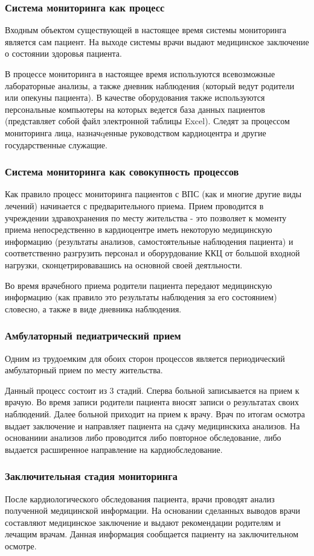 \subsubsection{Система мониторинга как процесс}

Входным объектом существующей в настоящее время системы мониторинга является сам
пациент. На выходе системы врачи выдают медицинское заключение о состоянии
здоровья пациента.

В процессе мониторинга в настоящее время используются всевозможные лабораторные
анализы, а также дневник наблюдения (который ведут родители или опекуны
пациента). В качестве оборудования также используются персональные компьютеры на
которых ведется база данных пациентов (представляет собой файл электронной
таблицы Excel). Следят за процессом мониторинга лица, назначqенные руководством
кардиоцентра и другие государственные служащие.

\subsubsection{Система мониторинга как совокупность процессов}

Как правило процесс мониторинга пациентов с ВПС (как и многие другие виды
лечений) начинается с предварительного приема. Прием проводится в учреждении
здравохранения по месту жительства - это позволяет к моменту приема
непосредственно в кардиоцентре  иметь некоторую медицинскую информацию
(результаты анализов, самостоятельные наблюдения пациента) и соответственно
разгрузить персонал и оборурдование ККЦ от большой входной нагрузки,
сконцетрировавашись на основной своей деятльности.

Во время врачебного приема родители пациента передают медицинскую информацию
(как правило это результаты наблюдения за его состоянием) словесно, а также  в
виде дневника наблюдения.

\subsubsection{Амбулаторный педиатрический прием}

Одним из трудоемким для обоих сторон процессов является периодический
амбулаторный прием по месту жительства.

Данный процесс состоит из 3 стадий. Сперва больной записывается на прием к
врачую. Во время записи родители пациента вносят записи о результатах своих
наблюдений. Далее больной приходит на прием к врачу. Врач по итогам осмотра
выдает заключение и направляет пациента на сдачу медицинскиха анализов. На
основаниии анализов либо проводится либо повторное обследование, либо выдается
расширенное направление на кардиобследование.

\subsubsection{Заключительная стадия мониторинга}

После кардиологического обследования пациента, врачи проводят анализ полученной
медицинской информации. На основании сделанных выводов врачи составляют
медицинское заключение и выдают рекомендации родителям и лечащим врачам. Данная
информация сообщается пациенту на заключительном осмотре.
